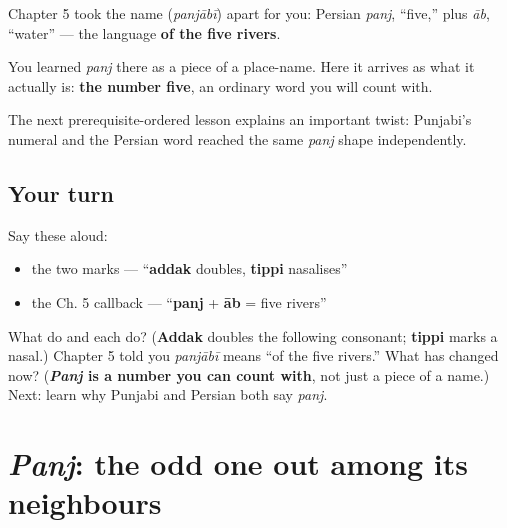 \begin{grammarlens}[title={What you've built: \pa{ਪੰਜ} as a number}]
Chapter 5 took the name \textbf{} (\emph{panjābī}) apart for you: Persian \textbf{} \emph{panj}, \textquotedblleft{}five,\textquotedblright{} plus \textbf{} \emph{āb}, \textquotedblleft{}water\textquotedblright{} — the language \textbf{of the five rivers}.

You learned \emph{panj} there as a piece of a place-name. Here it arrives as what it actually is: \textbf{the number five}, an ordinary word you will count with.

The next prerequisite-ordered lesson explains an important twist: Punjabi's numeral and the Persian word reached the same \emph{panj} shape independently.
\end{grammarlens}

\subsection*{Your turn}
Say these aloud:

\begin{itemize}
\raggedright
  \item the two marks — \textquotedblleft{}\textbf{addak} doubles, \textbf{tippi} nasalises\textquotedblright{}
  \item the Ch. 5 callback — \textquotedblleft{}\textbf{panj} + \textbf{āb} = five rivers\textquotedblright{}
\end{itemize}

\begin{tcolorbox}[breakable,colback=teal!4,colframe=teal!35!black,title={Before you move on}]
What do \textbf{} and \textbf{} each do? (\textbf{Addak} doubles the following consonant; \textbf{tippi} marks a nasal.) Chapter 5 told you \emph{panjābī} means \textquotedblleft{}of the five rivers.\textquotedblright{} What has changed now? (\textbf{\emph{Panj} is a number you can count with}, not just a piece of a name.) Next: learn why Punjabi and Persian both say \emph{panj}.
\end{tcolorbox}
\section[\texorpdfstring{\pa{ਪੰਜ} · panj (panj · panj)}{ਪੰਜ · panj (panj · panj)}]{\emph{Panj}: the odd one out among its neighbours}

\label{lesson:PA-C06-panj-convergence}



